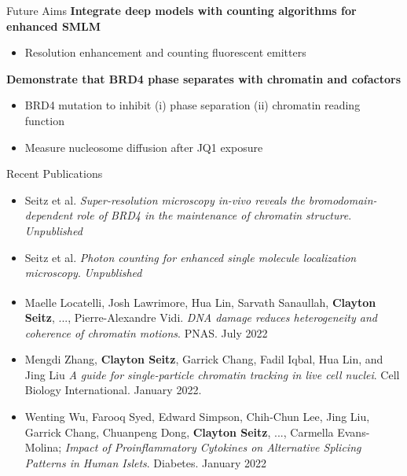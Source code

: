 \documentclass{beamer}					%
\begin{document}
\begin{frame}{Future Aims}
\textbf{Integrate deep models with counting algorithms for enhanced SMLM}
\begin{itemize}
\item Resolution enhancement and counting fluorescent emitters
\end{itemize}
\textbf{Demonstrate that BRD4 phase separates with chromatin and cofactors}
\begin{itemize}
\item BRD4 mutation to inhibit (i) phase separation (ii) chromatin reading function
\item Measure nucleosome diffusion after JQ1 exposure
\end{itemize}
\end{frame}

\begin{frame}

\end{frame}

\begin{frame}{Recent Publications}

\begin{itemize}
\item Seitz et al. \textit{Super-resolution microscopy in-vivo reveals the bromodomain-dependent role of BRD4 in the maintenance of chromatin structure}. \textit{Unpublished}

\item Seitz et al. \textit{Photon counting for enhanced single molecule localization microscopy}. \textit{Unpublished}

\item Maelle Locatelli\textsuperscript{\textdagger}, Josh Lawrimore\textsuperscript{\textdagger}, Hua Lin\textsuperscript{\textdagger}, Sarvath Sanaullah, \textbf{Clayton Seitz}, ..., Pierre-Alexandre Vidi. \textit{DNA damage reduces heterogeneity and coherence of chromatin motions}. PNAS. July 2022\\
\vspace{0.1in}
\item Mengdi Zhang, \textbf{Clayton Seitz}, Garrick Chang, Fadil Iqbal, Hua Lin, and Jing Liu \textit{A guide for single-particle chromatin tracking in live cell nuclei}. Cell Biology International. January 2022.\\
\vspace{0.1in}
\item Wenting Wu, Farooq Syed, Edward Simpson, Chih-Chun Lee, Jing Liu, Garrick Chang, Chuanpeng Dong, \textbf{Clayton Seitz}, ..., Carmella Evans-Molina; \textit{Impact of Proinflammatory Cytokines on Alternative Splicing Patterns in Human Islets}. Diabetes. January 2022
\end{itemize}
\end{frame}
\end{document}
